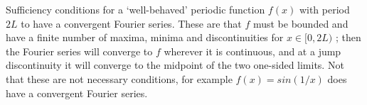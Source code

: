 Sufficiency conditions for a
`well-behaved' periodic function  $ f(x) $  with period  $ 2L $  to have a
convergent Fourier series. These are that  $ f $  must be bounded and
have a
finite number of maxima, minima and discontinuities for  $ x \in [0,2L) $ ;
then the Fourier series will converge to  $ f $  wherever it is
continuous, and at a jump discontinuity it will converge to the
midpoint of the two one-sided limits. Not that these are not
necessary conditions, for example  $ f(x)= sin(1/x) $  does have a
convergent Fourier series.


